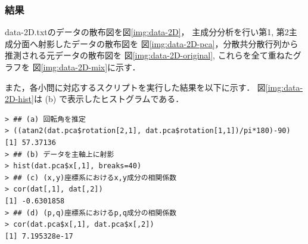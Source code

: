 \documentclass{jsarticle}
\begin{document}
\subsubsection*{結果}
data-2D.txtのデータの散布図を図\ref{img:data-2D}，
主成分分析を行い第1, 第2主成分面へ射影したデータの散布図を
図\ref{img:data-2D-pca}，分散共分散行列から推測される元データの散布図を
図\ref{img:data-2D-original}, これらを全て重ねたグラフを
図\ref{img:data-2D-mix}に示す．

また，各小問に対応するスクリプトを実行した結果を以下に示す．
図\ref{img:data-2D-hist}は (b) で表示したヒストグラムである．
\begin{verbatim}
> ## (a) 回転角を推定
> ((atan2(dat.pca$rotation[2,1], dat.pca$rotation[1,1])/pi*180)-90)
[1] 57.37136
> ## (b) データを主軸上に射影
> hist(dat.pca$x[,1], breaks=40)
> ## (c) (x,y)座標系におけるx,y成分の相関係数
> cor(dat[,1], dat[,2])
[1] -0.6301858
> ## (d) (p,q)座標系におけるp,q成分の相関係数
> cor(dat.pca$x[,1], dat.pca$x[,2])
[1] 7.195328e-17
\end{verbatim}
\end{document}
